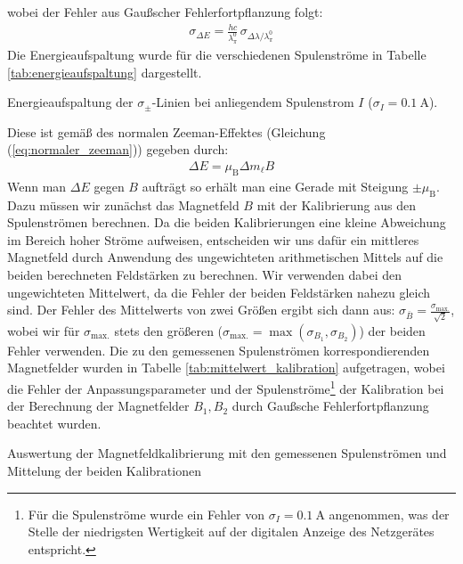 \documentclass[11pt, a4paper]{article}
\begin{document}
wobei der Fehler aus Gaußscher Fehlerfortpflanzung folgt:
\begin{align}
	\sigma_{\Delta E} = \frac{h c}{\lambda_\pi^0} \, \sigma_{\Delta \lambda / \lambda_\pi^0}
\end{align}
Die Energieaufspaltung wurde für die verschiedenen Spulenströme in Tabelle \ref{tab:energieaufspaltung} dargestellt.
\begin{table}[h]
	\centering
	
	\caption{Energieaufspaltung der $\sigma_\pm$-Linien bei anliegendem Spulenstrom $I$ ($\sigma_I = \SI{0.1}{\ampere}$).}
	\label{tab:energieaufspaltung}
\end{table}
Diese ist gemäß des normalen Zeeman-Effektes (Gleichung (\ref{eq:normaler_zeeman})) gegeben durch:
\begin{align}
	\Delta E = \mu_\mathrm{B} \Delta m_\ell B
	\label{eq:normaler_zeeman_auswertung}
\end{align}
Wenn man $\Delta E$ gegen $B$ aufträgt so erhält man eine Gerade mit Steigung $\pm \mu_\mathrm{B}$.
Dazu müssen wir zunächst das Magnetfeld $B$ mit der Kalibrierung aus den Spulenströmen berechnen.
Da die beiden Kalibrierungen eine kleine Abweichung im Bereich hoher Ströme aufweisen, entscheiden wir uns dafür ein mittleres Magnetfeld durch Anwendung des ungewichteten arithmetischen Mittels auf die beiden berechneten Feldstärken zu berechnen.
Wir verwenden dabei den ungewichteten Mittelwert, da die Fehler der beiden Feldstärken nahezu gleich sind.
Der Fehler des Mittelwerts von zwei Größen ergibt sich dann aus: $\sigma_{\bar{B}} = \frac{\sigma_\mathrm{max.}}{\sqrt{2}}$, wobei wir für $\sigma_\mathrm{max.}$ stets den größeren ($\sigma_\mathrm{max.} = \max(\sigma_{B_1}, \sigma_{B_2}) $) der beiden Fehler verwenden.
Die zu den gemessenen Spulenströmen korrespondierenden Magnetfelder wurden in Tabelle \ref{tab:mittelwert_kalibration} aufgetragen, wobei die Fehler der Anpassungsparameter und der Spulenströme\footnote{Für die Spulenströme wurde ein Fehler von $\sigma_I = \SI{0.1}{\ampere}$ angenommen, was der Stelle der niedrigsten Wertigkeit auf der digitalen Anzeige des Netzgerätes entspricht.} der Kalibration bei der Berechnung der Magnetfelder $B_1, B_2$ durch Gaußsche Fehlerfortpflanzung beachtet wurden.
\begin{table}[h]
	\centering
	
	\caption{Auswertung der Magnetfeldkalibrierung mit den gemessenen Spulenströmen und Mittelung der beiden Kalibrationen}
	\label{tab:mittelwert_kalibration}
\end{table}
\end{document}
